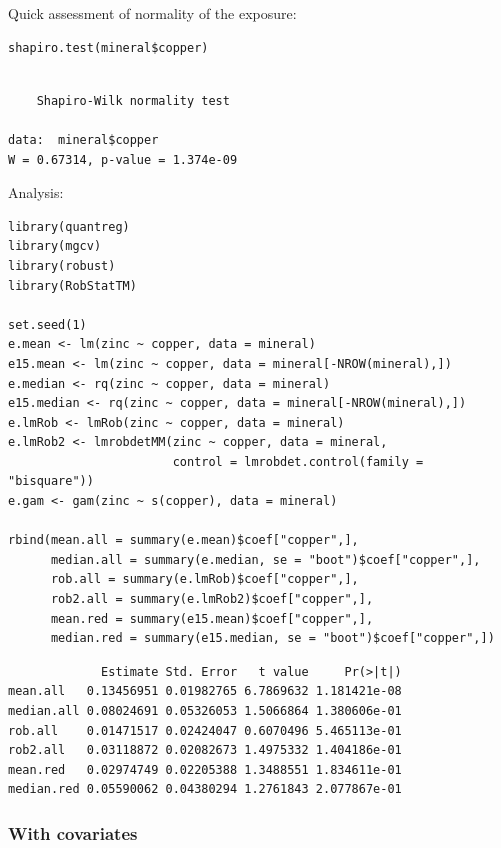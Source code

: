 \documentclass[12pt]{article}
\begin{document}
Quick assessment of normality of the exposure:
\lstset{language=r,label= ,caption= ,captionpos=b,numbers=none}
\begin{lstlisting}
shapiro.test(mineral$copper)
\end{lstlisting}

\begin{verbatim}

	Shapiro-Wilk normality test

data:  mineral$copper
W = 0.67314, p-value = 1.374e-09
\end{verbatim}


Analysis:
\lstset{language=r,label= ,caption= ,captionpos=b,numbers=none}
\begin{lstlisting}
library(quantreg)
library(mgcv)
library(robust)
library(RobStatTM)

set.seed(1)
e.mean <- lm(zinc ~ copper, data = mineral)
e15.mean <- lm(zinc ~ copper, data = mineral[-NROW(mineral),])
e.median <- rq(zinc ~ copper, data = mineral)
e15.median <- rq(zinc ~ copper, data = mineral[-NROW(mineral),])
e.lmRob <- lmRob(zinc ~ copper, data = mineral)
e.lmRob2 <- lmrobdetMM(zinc ~ copper, data = mineral,
                       control = lmrobdet.control(family = "bisquare"))
e.gam <- gam(zinc ~ s(copper), data = mineral)

rbind(mean.all = summary(e.mean)$coef["copper",],
      median.all = summary(e.median, se = "boot")$coef["copper",],
      rob.all = summary(e.lmRob)$coef["copper",],
      rob2.all = summary(e.lmRob2)$coef["copper",],
      mean.red = summary(e15.mean)$coef["copper",],
      median.red = summary(e15.median, se = "boot")$coef["copper",])
\end{lstlisting}

\begin{verbatim}
             Estimate Std. Error   t value     Pr(>|t|)
mean.all   0.13456951 0.01982765 6.7869632 1.181421e-08
median.all 0.08024691 0.05326053 1.5066864 1.380606e-01
rob.all    0.01471517 0.02424047 0.6070496 5.465113e-01
rob2.all   0.03118872 0.02082673 1.4975332 1.404186e-01
mean.red   0.02974749 0.02205388 1.3488551 1.834611e-01
median.red 0.05590062 0.04380294 1.2761843 2.077867e-01
\end{verbatim}


\clearpage

\subsubsection{With covariates}
\label{sec:org511bc42}
\end{document}
